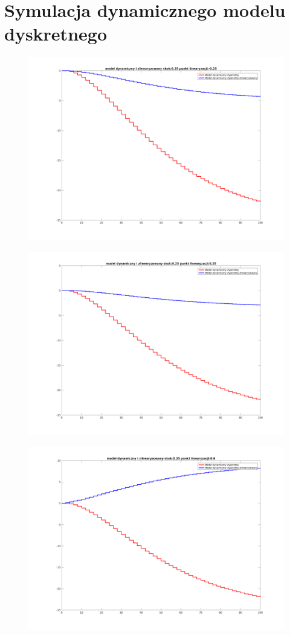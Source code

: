 \documentclass[a4paper, 11pt]{article}
\begin{document}
\section{Symulacja dynamicznego modelu dyskretnego}
\begin{figure}[H]
\centering
\includegraphics[scale=0.45]{925m25.png}
\end{figure}
\begin{figure}[H]
\centering
\includegraphics[scale=0.45]{92525.png}
\end{figure}
\begin{figure}[H]
\centering
\includegraphics[scale=0.45]{9256.png}
\end{figure}
\end{document}
